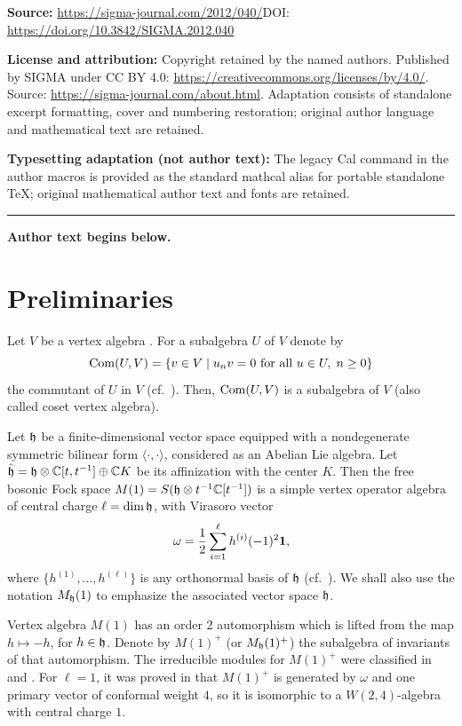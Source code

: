 \documentclass[11pt]{article}
\newcommand{\C}{\Bbb C}
\newcommand{\1}{\bf 1}
\begin{document}
\noindent\textbf{Source:} \url{https://sigma-journal.com/2012/040/}\quad DOI: \url{https://doi.org/10.3842/SIGMA.2012.040}\par
\noindent\textbf{License and attribution:} Copyright retained by the named authors. Published by SIGMA under CC BY 4.0: \url{https://creativecommons.org/licenses/by/4.0/}. Source: \url{https://sigma-journal.com/about.html}. Adaptation consists of standalone excerpt formatting, cover and numbering restoration; original author language and mathematical text are retained.\par
\noindent\textbf{Typesetting adaptation (not author text):} The legacy Cal command in the author macros is provided as the standard mathcal alias for portable standalone TeX; original mathematical author text and fonts are retained.\par
\medskip\hrule\medskip\noindent\textbf{Author text begins below.}\par
\setcounter{section}{1}
\setcounter{subsection}{0}
\setcounter{subsubsection}{0}
\setcounter{equation}{2}
\section{Preliminaries}

Let $V$ be a vertex algebra \cite{B, FHL, FLM,LL}. For a subalgebra $U$ of $V$ denote by
\[
{\rm Com}(U,V)= \{ v \in V \; | \; u_n v =0 \mbox{ for all } u \in U,\;
n \geq 0 \} \]
%
 the commutant of $U$ in $V$ (cf.~\cite{FZ, GKO,LL}). Then, ${\rm Com}(U,V)$ is a
subalgebra of $V$ (also called coset vertex algebra).



Let ${\frak h}$ be a f\/inite-dimensional vector space equipped with a
nondegenerate symmetric bilinear form $\langle \cdot, \cdot
\rangle$, considered as an Abelian Lie algebra. Let $\hat{\frak h} =
{\frak h} \otimes {\C}[t,t^{-1}] \oplus {\C} K$ be its af\/f\/inization
with the center $K$. Then the free bosonic Fock space
$M(1) = S({\frak h} \otimes t^{-1} \C[t^{-1}])$ is a simple vertex
operator algebra of central charge $\ell = \dim {\frak h}$, with
Virasoro vector
\[
 \omega =\frac{1}{2} \sum _{i=1}^{\ell} h^{(i)}(-1)^2 {\1},\]
  where
$\{ h^{(1)}, \ldots , h^{(\ell)} \} $ is any orthonormal basis of
${\frak h}$ (cf.~\cite{FLM, LL}). We shall also use the
notation $M_{\frak h}(1)$ to emphasize the associated vector space
${\frak h}$.

Vertex algebra $M(1)$  has an order 2 automorphism which is lifted
from the map $h \mapsto -h$, for $h \in {\frak h}$. Denote by  $M(1)
^+$ (or $M_{\frak h}(1) ^+$) the subalgebra of invariants of that
automorphism. The irreducible modules for $M(1) ^+$ were classif\/ied
in \cite{DN1} and \cite{DN2}. For $\ell =1$, it was proved in
\cite{DG} that $M(1) ^+$ is generated by $\omega$ and one primary
vector of conformal weight $4$, so it is isomorphic to a
$W(2,4)$-algebra with central charge $1$.
\end{document}

